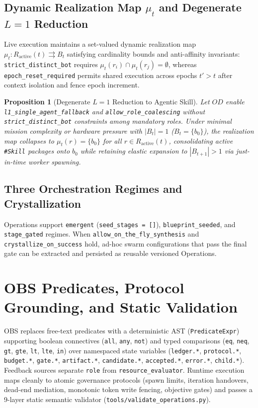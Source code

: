 \documentclass[11pt,a4paper]{article}
\newtheorem{proposition}{Proposition}
\begin{document}
\subsection{Dynamic Realization Map $\mu_t$ and Degenerate $L=1$ Reduction}
Live execution maintains a set-valued dynamic realization map $\mu_t : R_{\mathrm{active}}(t) \rightrightarrows B_t$ satisfying cardinality bounds and anti-affinity invariants: \texttt{strict\_distinct\_bot} requires $\mu_t(r_i) \cap \mu_t(r_j) = \emptyset$, whereas \texttt{epoch\_reset\_required} permits shared execution across epochs $t' > t$ after context isolation and fence epoch increment.

\begin{proposition}[Degenerate $L=1$ Reduction to Agentic Skill]\label{prop:l1}
Let $OD$ enable \texttt{l1\_single\_agent\_fallback} and \texttt{allow\_role\_coalescing} without \texttt{strict\_distinct\_bot} constraints among mandatory roles. Under minimal mission complexity or hardware pressure with $|B_t| = 1$ ($B_t = \{b_0\}$), the realization map collapses to $\mu_t(r) = \{b_0\}$ for all $r \in R_{\mathrm{active}}(t)$, consolidating active \texttt{\#Skill} packages onto $b_0$ while retaining elastic expansion to $|B_{t+1}| > 1$ via just-in-time worker spawning.
\end{proposition}

\subsection{Three Orchestration Regimes and Crystallization}
Operations support \texttt{emergent} (\texttt{seed\_stages = []}), \texttt{blueprint\_seeded}, and \texttt{stage\_gated} regimes. When \texttt{allow\_on\_the\_fly\_synthesis} and \texttt{crystallize\_on\_success} hold, ad-hoc swarm configurations that pass the final gate can be extracted and persisted as reusable versioned Operations.

\section{OBS Predicates, Protocol Grounding, and Static Validation}
OBS replaces free-text predicates with a deterministic AST (\texttt{PredicateExpr}) supporting boolean connectives (\texttt{all}, \texttt{any}, \texttt{not}) and typed comparisons (\texttt{eq}, \texttt{neq}, \texttt{gt}, \texttt{gte}, \texttt{lt}, \texttt{lte}, \texttt{in}) over namespaced state variables (\texttt{ledger.*}, \texttt{protocol.*}, \texttt{budget.*}, \texttt{gate.*}, \texttt{artifact.*}, \texttt{candidate.*}, \texttt{accepted.*}, \texttt{error.*}, \texttt{child.*}). Feedback sources separate \texttt{role} from \texttt{resource\_evaluator}. Runtime execution maps cleanly to atomic governance protocols (spawn limits, iteration handovers, dead-end mediation, monotonic token write fencing, objective gates) and passes a 9-layer static semantic validator (\texttt{tools/validate\_operations.py}).
\end{document}
